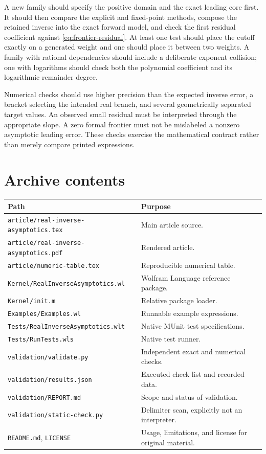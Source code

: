\documentclass[11pt,a4paper]{article}
\numberwithin{equation}{section}
\theoremstyle{definition}\newtheorem{definition}[theorem]{Definition}
\theoremstyle{remark}\newtheorem{remark}[theorem]{Remark}
\newcommand{\code}[1]{\texttt{#1}}
\begin{document}
A new family should specify the positive domain and the exact leading
core first. It should then compare the explicit and fixed-point methods,
compose the retained inverse into the exact forward model, and check the
first residual coefficient against \cref{eq:frontier-residual}. At least
one test should place the cutoff exactly on a generated weight and one
should place it between two weights. A family with rational dependencies
should include a deliberate exponent collision; one with logarithms
should check both the polynomial coefficient and its logarithmic
remainder degree.

Numerical checks should use higher precision than the expected inverse
error, a bracket selecting the intended real branch, and several
geometrically separated target values. An observed small residual must
be interpreted through the appropriate slope. A zero formal frontier
must not be mislabeled a nonzero asymptotic leading error. These checks
exercise the mathematical contract rather than merely compare printed
expressions.

\section{Archive contents}

\begin{longtable}{@{}p{}p{}@{}}
\toprule
Path & Purpose \\
\midrule
\endhead
\code{article/real-inverse-asymptotics.tex} & Main article source. \\
\code{article/real-inverse-asymptotics.pdf} & Rendered article. \\
\code{article/numeric-table.tex} & Reproducible numerical table. \\
\code{Kernel/RealInverseAsymptotics.wl} & Wolfram Language reference package. \\
\code{Kernel/init.m} & Relative package loader. \\
\code{Examples/Examples.wl} & Runnable example expressions. \\
\code{Tests/RealInverseAsymptotics.wlt} & Native MUnit test specifications. \\
\code{Tests/RunTests.wls} & Native test runner. \\
\code{validation/validate.py} & Independent exact and numerical checks. \\
\code{validation/results.json} & Executed check list and recorded data. \\
\code{validation/REPORT.md} & Scope and status of validation. \\
\code{validation/static-check.py} & Delimiter scan, explicitly not an interpreter. \\
\code{README.md}, \code{LICENSE} & Usage, limitations, and license for original material. \\
\bottomrule
\end{longtable}
\end{document}
